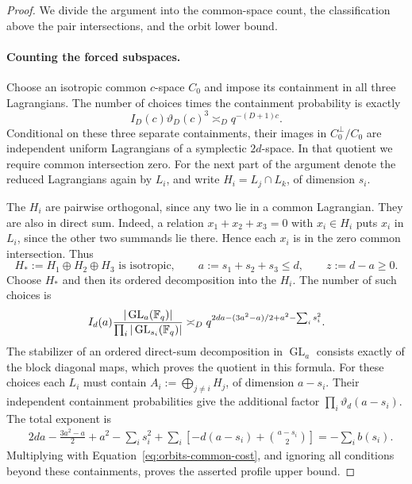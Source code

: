\begin{proof}
We divide the argument into the common-space count, the classification
above the pair intersections, and the orbit lower bound.

\paragraph{Counting the forced subspaces.}
Choose an isotropic common $c$-space $C_0$ and impose its containment in
all three Lagrangians.  The number of choices times the containment
probability is exactly
\begin{equation}
 I_D(c)\vartheta_D(c)^3\asymp_D q^{-(D+1)c}.
 \label{eq:orbits-common-cost}
\end{equation}
Conditional on these three separate containments, their images in
$C_0^\perp/C_0$ are independent uniform Lagrangians of a symplectic
$2d$-space.  In that quotient we require common intersection zero.
For the next part of the argument denote the reduced Lagrangians again
by $L_i$, and write $H_i=L_j\cap L_k$, of dimension $s_i$.

The $H_i$ are pairwise orthogonal, since any two lie in a common
Lagrangian.  They are also in direct sum.  Indeed, a relation
$x_1+x_2+x_3=0$ with $x_i\in H_i$ puts $x_i$ in $L_i$, since the other
two summands lie there.  Hence each $x_i$ is in the zero common
intersection.  Thus
\begin{equation}
 H_*:=H_1\oplus H_2\oplus H_3\text{ is isotropic},
 \qquad a:=s_1+s_2+s_3\le d,
 \qquad z:=d-a\ge0.
 \label{eq:orbits-pair-sum}
\end{equation}
Choose $H_*$ and then its ordered decomposition into the $H_i$.
The number of such choices is
\begin{equation}
 I_d(a)\frac{|\operatorname{GL}_a(\mathbb F_q)|}
 {\prod_i|\operatorname{GL}_{s_i}(\mathbb F_q)|}
 \asymp_D
 q^{2da-(3a^2-a)/2+a^2-\sum_i s_i^2}.
 \label{eq:orbits-pair-space-count}
\end{equation}
The stabilizer of an ordered direct-sum decomposition in
$\operatorname{GL}_a$ consists exactly of the block diagonal maps,
which proves the quotient in this formula.
For these choices each $L_i$ must contain
$A_i:=\bigoplus_{j\ne i}H_j$, of dimension $a-s_i$.
Their independent containment probabilities give the additional factor
$\prod_i\vartheta_d(a-s_i)$.  The total exponent is
\begin{align}
 &2da-\frac{3a^2-a}{2}+a^2-\sum_i s_i^2
 +\sum_i\left[-d(a-s_i)+\binom{a-s_i}{2}\right]
 =-\sum_i b(s_i).
 \label{eq:orbits-pair-cost-cancellation}
\end{align}
Multiplying with Equation~\eqref{eq:orbits-common-cost}, and ignoring
all conditions beyond these containments, proves the asserted profile
upper bound.


\end{proof}
